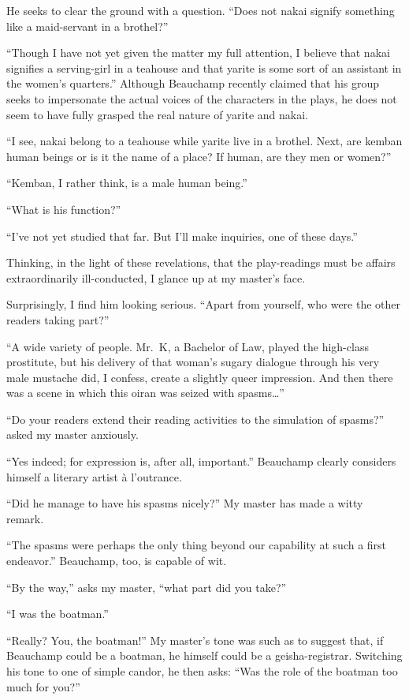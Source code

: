 \documentclass[12pt, openright]{book}
\begin{document}
He seeks to clear the ground with a question. ``Does not nakai signify
something like a maid-servant in a brothel?''

``Though I have not yet given the matter my full attention, I believe
that nakai signifies a serving-girl in a teahouse and that yarite is
some sort of an assistant in the women's quarters.'' Although Beauchamp
recently claimed that his group seeks to impersonate the actual voices
of the characters in the plays, he does not seem to have fully grasped
the real nature of yarite and nakai.

``I see, nakai belong to a teahouse while yarite live in a brothel.
Next, are kemban human beings or is it the name of a place? If human,
are they men or women?''

``Kemban, I rather think, is a male human being.''

``What is his function?''

``I've not yet studied that far. But I'll make inquiries, one of these
days.''

Thinking, in the light of these revelations, that the play-readings must
be affairs extraordinarily ill-conducted, I glance up at my master's
face.

Surprisingly, I find him looking serious. ``Apart from yourself, who
were the other readers taking part?''

``A wide variety of people. Mr.~K, a Bachelor of Law, played the
high-class prostitute, but his delivery of that woman's sugary dialogue
through his very male mustache did, I confess, create a slightly queer
impression. And then there was a scene in which this oiran was seized
with spasms\ldots{}''

``Do your readers extend their reading activities to the simulation of
spasms?'' asked my master anxiously.

``Yes indeed; for expression is, after all, important.'' Beauch\-amp
clearly considers himself a literary artist à l'outrance.

``Did he manage to have his spasms nicely?'' My master has made a witty
remark.

``The spasms were perhaps the only thing beyond our capability at such a
first endeavor.'' Beauchamp, too, is capable of wit.

``By the way,'' asks my master, ``what part did you take?''

``I was the boatman.''

``Really? You, the boatman!'' My master's tone was such as to suggest
that, if Beauchamp could be a boatman, he himself could be a
geisha-registrar. Switching his tone to one of simple candor, he then
asks: ``Was the role of the boatman too much for you?''
\end{document}

